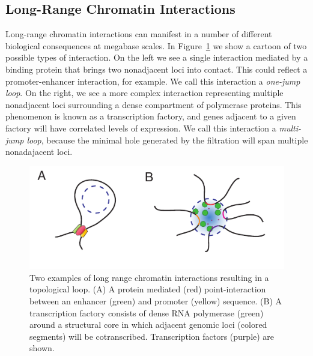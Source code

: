 \subsection{Long-Range Chromatin Interactions}
%
Long-range chromatin interactions can manifest in a number of different biological consequences at megabase scales.
In Figure~\ref{fig:chromatin_interactions} we show a cartoon of two possible types of interaction.
On the left we see a single interaction mediated by a binding protein that brings two nonadjacent loci into contact.
This could reflect a promoter-enhancer interaction, for example.
We call this interaction a \emph{one-jump loop}.
On the right, we see a more complex interaction representing multiple nonadjacent loci surrounding a dense compartment of polymerase proteins.
This phenomenon is known as a transcription factory, and genes adjacent to a given factory will have correlated levels of expression.
We call this interaction a \emph{multi-jump loop}, because the minimal hole generated by the filtration will span multiple nonadajacent loci.

\begin{figure}
       \centering
       \includegraphics[width=\columnwidth]{./fig/chromatin_interactions.pdf}
       \caption{Two examples of long range chromatin interactions resulting in a topological loop. (A) A protein mediated (red) point-interaction between an enhancer (green) and promoter (yellow) sequence. (B) A transcription factory consists of dense RNA polymerase (green) around a structural core in which adjacent genomic loci (colored segments) will be cotranscribed. Transcription factors (purple) are shown.}
       \label{fig:chromatin_interactions}
\end{figure}

